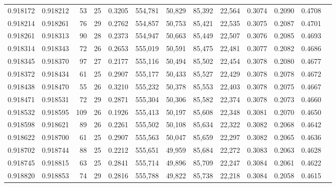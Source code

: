 \begin{tabular}{rrrrrrrrrrrrr}
0.918172 & 0.918212 &    53 &  25 &                                     0.3205 & 554,781 &  50,829 &  85,392 &  22,564 & 0.3074 & 0.2090 & 0.4708 \\
0.918214 & 0.918261 &    76 &  29 &                                     0.2762 & 554,857 &  50,753 &  85,421 &  22,535 & 0.3075 & 0.2087 & 0.4701 \\
0.918261 & 0.918313 &    90 &  28 &                                     0.2373 & 554,947 &  50,663 &  85,449 &  22,507 & 0.3076 & 0.2085 & 0.4693 \\
0.918314 & 0.918343 &    72 &  26 &                                     0.2653 & 555,019 &  50,591 &  85,475 &  22,481 & 0.3077 & 0.2082 & 0.4686 \\
0.918345 & 0.918370 &    97 &  27 &                                     0.2177 & 555,116 &  50,494 &  85,502 &  22,454 & 0.3078 & 0.2080 & 0.4677 \\
0.918372 & 0.918434 &    61 &  25 &                                     0.2907 & 555,177 &  50,433 &  85,527 &  22,429 & 0.3078 & 0.2078 & 0.4672 \\
0.918438 & 0.918470 &    55 &  26 &                                     0.3210 & 555,232 &  50,378 &  85,553 &  22,403 & 0.3078 & 0.2075 & 0.4667 \\
0.918471 & 0.918531 &    72 &  29 &                                     0.2871 & 555,304 &  50,306 &  85,582 &  22,374 & 0.3078 & 0.2073 & 0.4660 \\
0.918532 & 0.918595 &   109 &  26 &                                     0.1926 & 555,413 &  50,197 &  85,608 &  22,348 & 0.3081 & 0.2070 & 0.4650 \\
0.918598 & 0.918621 &    89 &  26 &                                     0.2261 & 555,502 &  50,108 &  85,634 &  22,322 & 0.3082 & 0.2068 & 0.4642 \\
0.918622 & 0.918700 &    61 &  25 &                                     0.2907 & 555,563 &  50,047 &  85,659 &  22,297 & 0.3082 & 0.2065 & 0.4636 \\
0.918702 & 0.918744 &    88 &  25 &                                     0.2212 & 555,651 &  49,959 &  85,684 &  22,272 & 0.3083 & 0.2063 & 0.4628 \\
0.918745 & 0.918815 &    63 &  25 &                                     0.2841 & 555,714 &  49,896 &  85,709 &  22,247 & 0.3084 & 0.2061 & 0.4622 \\
0.918820 & 0.918853 &    74 &  29 &                                     0.2816 & 555,788 &  49,822 &  85,738 &  22,218 & 0.3084 & 0.2058 & 0.4615 \\

\end{tabular}
